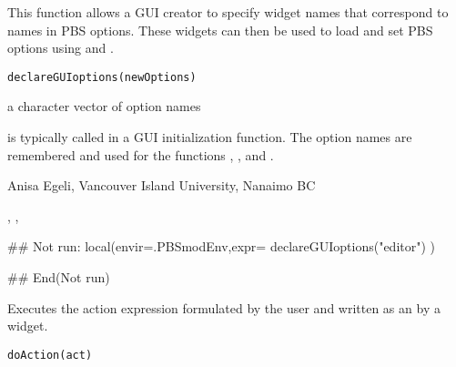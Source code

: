 \documentclass[letterpaper]{book}
\begin{document}
%
\begin{Description}\relax
This function allows a GUI creator to specify widget names that 
correspond to names in PBS options. These widgets can then be 
used to load and set PBS options using  and 
.
\end{Description}
%
\begin{Usage}
\begin{verbatim}
declareGUIoptions(newOptions)
\end{verbatim}
\end{Usage}
%
\begin{Arguments}
\begin{ldescription}
\item[\code{newOptions}] a character vector of option names
\end{ldescription}
\end{Arguments}
%
\begin{Details}\relax
{} is typically called in a GUI initialization function.
The option names are remembered and used for the functions 
, , and .
\end{Details}
%
\begin{Author}\relax
Anisa Egeli, Vancouver Island University, Nanaimo BC
\end{Author}
%
\begin{SeeAlso}\relax
{}, ,
\end{SeeAlso}
%
\begin{Examples}
\begin{ExampleCode}
## Not run: 
local(envir=.PBSmodEnv,expr={
  declareGUIoptions("editor")
})

## End(Not run)
\end{ExampleCode}
\end{Examples}
%
\begin{Description}\relax
Executes the action expression formulated by the user and 
written as an  by a widget.
\end{Description}
%
\begin{Usage}
\begin{verbatim}
doAction(act)
\end{verbatim}
\end{Usage}
\end{document}
